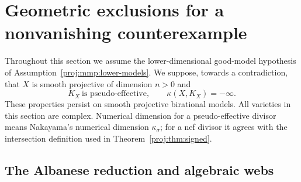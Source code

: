 \section{Geometric exclusions for a nonvanishing counterexample}
\label{proj:sec:exclusions}

Throughout this section we assume the lower-dimensional good-model
hypothesis of Assumption~\ref{proj:mmp:lower-models}. We suppose, towards a
contradiction, that \(X\) is smooth projective of dimension \(n>0\) and
\begin{equation}\label{proj:ex:counterexample}
 K_X\ \text{is pseudo-effective},
 \qquad \kappa(X,K_X)=-\infty.
\end{equation}
These properties persist on smooth projective birational models. All
varieties in this section are complex. Numerical dimension for a
pseudo-effective divisor means Nakayama's numerical dimension
\(\kappa_\sigma\); for a nef divisor it agrees with the intersection
definition used in Theorem~\ref{proj:thm:signed}.

\subsection{The Albanese reduction and algebraic webs}

